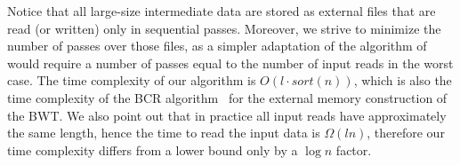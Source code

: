 \documentclass[runningheads,envcountsame,a4paper]{llncs}
\begin{document}
Notice that all large-size intermediate data are stored as external files that
are read (or written) only in sequential passes.
Moreover, we strive to minimize the number of passes over those files, as a
simpler adaptation of the algorithm of~\cite{Bauer2011} would require a number
of passes equal to the number of input reads in the worst case.
The time complexity of our algorithm is $O(l \cdot  sort(n))$, which is also the
time complexity of the BCR algorithm~\cite{Bauer2013} for the external memory
construction of the BWT.
We also point out that in practice all input reads have approximately the same
length, hence the time to read the input data is $\Omega(ln)$, therefore our
time complexity differs from a lower bound only by a $\log n$ factor.








\begin{comment}
--------- non so dove vada-----------------


A key observation in our work is the fact that due to the fact that a
BWT consists of the symbols that precedes the lexicographic ordering of
suffixes of the reads of a collection, it is possible to "walk"
consecutively on the BWT of the collection of reads and of the reversed
version of the reads and then building a forward and backward extension
of a $Q$-substring by symbols of the alphabet lexicographically ordered.
All this can be done entirely using files for each symbol of the
alphabet and files for the BWT and its reversed version.
\end{comment}


\begin{comment}
descrizione The FM-index .... [inserire citazione FM-index]

With the advent of NGS data, the investigation of the BWT has moved
towards its use in indexing huge collections of texts, represented by
the reads of variable length.
The notion of Extended Borrows Wheeler has been proposed to deal with a
collection of texts~\cite{Bauer2011} and its potentiality in
Bioinformatics to index read data has been investigated in ....

While the BWT has been deeply used for the alignment of reads to a
reference genome, for the first time the BWT has been explored as a tool
for de novo assembly.

In~\cite{Simpson2010} Durbin addresses the problem of having a more
efficient space FM-index implementation of the string graph problem.

---results----

\end{comment}
\end{document}
